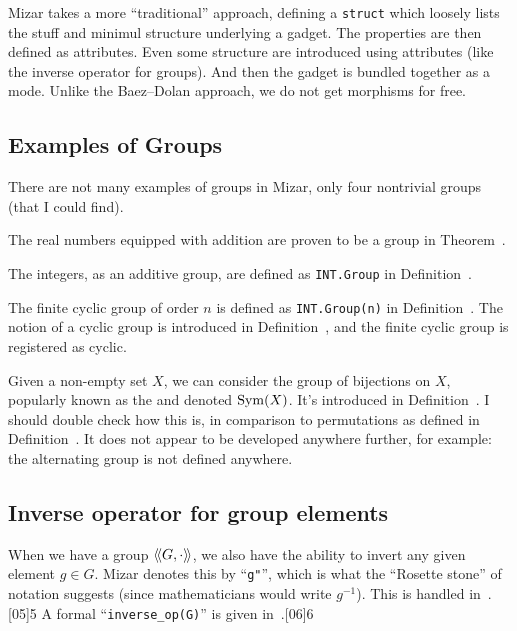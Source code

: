Mizar takes a more ``traditional'' approach, defining a
\lstinline{struct} which loosely lists the stuff and minimul structure
underlying a gadget. The properties are then defined as attributes. Even
some structure are introduced using attributes (like the inverse
operator for groups). And then the gadget is bundled together as a
mode. Unlike the Baez--Dolan approach, we do not get morphisms for free.

\subsection{Examples of Groups}
There are not many examples of groups in Mizar, only four nontrivial
groups (that I could find).

\begin{example}
  The real numbers equipped with addition are proven to be a group in
  Theorem~.
\end{example}

\begin{example}
The integers, as an additive group, are defined as \lstinline|INT.Group|
in Definition~.
\end{example}

\begin{example}\label{example:introduction:cyclic-group}
The finite cyclic group of order $n$ is defined as \lstinline|INT.Group(n)|
in Definition~. The notion of a cyclic group is
introduced in Definition~, and the finite cyclic
group is registered as cyclic.
\end{example}

\begin{example}
Given a non-empty set $X$, we can consider the group of bijections on
$X$, popularly known as the  and denoted
$\operatorname{Sym}(X)$. It's introduced in Definition~. I should
double check how this is, in comparison to permutations as defined in
Definition~. It does not appear to be developed
anywhere further, for example: the alternating group is not defined anywhere.
\end{example}


\subsection{Inverse operator for group elements}
When we have a group $\struct{G,\cdot}$, we also have the ability
to invert any given element $g\in G$. Mizar denotes this by
``\verb#g"#'', which is what the ``Rosette stone'' of notation suggests
(since mathematicians would write $g^{-1}$). This is handled in~.[05]{5}
A formal ``\verb#inverse_op(G)#'' is given in~.[06]{6}

